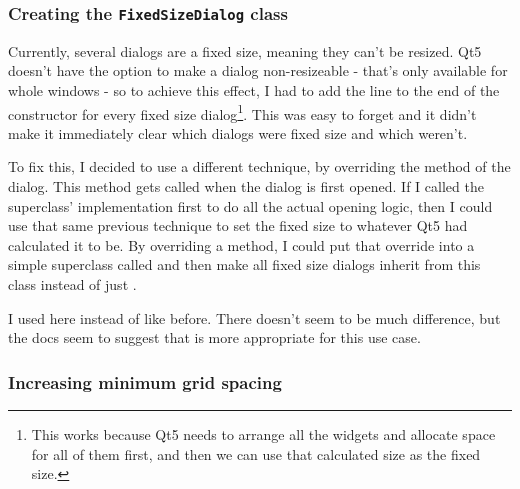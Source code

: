 \documentclass[../development.tex]{subfiles}
\begin{document}
\subsubsection{Creating the \texttt{FixedSizeDialog} class\label{development:preparing-for-v0.2.1:creating-the-FixedSizeDialog-class}}

Currently, several dialogs are a fixed size, meaning they can't be resized. Qt5 doesn't have the option to make a dialog non-resizeable - that's only available for whole windows - so to achieve this effect, I had to add the line  to the end of the constructor for every fixed size dialog\footnote{This works because Qt5 needs to arrange all the widgets and allocate space for all of them first, and then we can use that calculated size as the fixed size.}. This was easy to forget and it didn't make it immediately clear which dialogs were fixed size and which weren't.

To fix this, I decided to use a different technique, by overriding the  method of the dialog. This method gets called when the dialog is first opened. If I called the superclass' implementation first to do all the actual opening logic, then I could use that same previous technique to set the fixed size to whatever Qt5 had calculated it to be. By overriding a method, I could put that override into a simple superclass called  and then make all fixed size dialogs inherit from this class instead of just .




I used  here instead of  like before. There doesn't seem to be much difference, but the docs seem to suggest that  is more appropriate for this use case\cite{qt5-docs-qwidget-basesize}\cite{qt5-docs-qwidget-size}.

\subsubsection{Increasing minimum grid spacing\label{development:preparing-for-v0.2.1:increasing-minimum-grid-spacing}}
\end{document}
